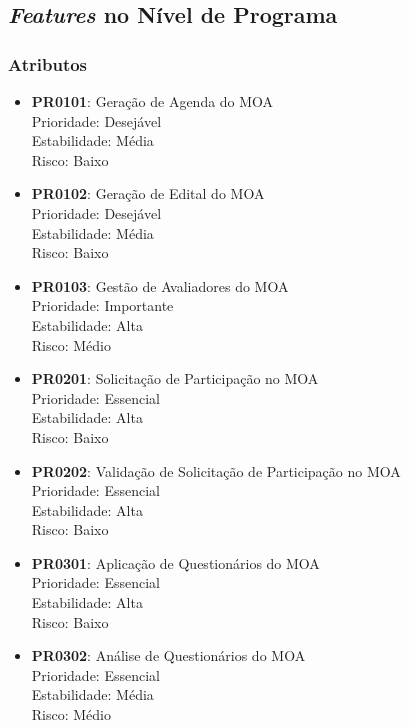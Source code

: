 \subsection[\emph{Features} no Nível de Programa]{\emph{Features} no Nível de Programa}
\label{subsec:requisitos_priorizacao_programa}
	\subsubsection[Atributos]{Atributos}
	\label{subsubsec:requisitos_priorizacao_programa_atributos}
		\begin{itemize}
			\item{\textbf{PR0101}: Geração de Agenda do MOA
			\\ Prioridade: Desejável
			\\ Estabilidade: Média
			\\ Risco: Baixo}
			\item{\textbf{PR0102}: Geração de Edital do MOA
			\\ Prioridade: Desejável
			\\ Estabilidade: Média
			\\ Risco: Baixo}
			\item{\textbf{PR0103}: Gestão de Avaliadores do MOA
			\\ Prioridade: Importante
			\\ Estabilidade: Alta
			\\ Risco: Médio}
			\item{\textbf{PR0201}: Solicitação de Participação no MOA
			\\ Prioridade: Essencial
			\\ Estabilidade: Alta
			\\ Risco: Baixo}
			\item{\textbf{PR0202}: Validação de Solicitação de Participação no MOA
			\\ Prioridade: Essencial
			\\ Estabilidade: Alta
			\\ Risco: Baixo}
			\item{\textbf{PR0301}: Aplicação de Questionários do MOA
			\\ Prioridade: Essencial
			\\ Estabilidade: Alta
			\\ Risco: Baixo}
			\item{\textbf{PR0302}: Análise de Questionários do MOA
			\\ Prioridade: Essencial
			\\ Estabilidade: Média
			\\ Risco: Médio}

\end{itemize}
